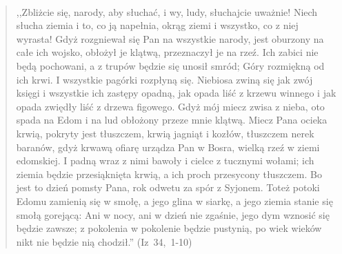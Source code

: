 \documentclass[10pt,a4paper,oneside]{article}
\begin{document}
\paragraph{}
\begin{quote}
,,Zbliżcie się, narody, aby słuchać, i wy, ludy, słuchajcie uważnie! Niech słucha ziemia i to, co ją napełnia, okrąg ziemi i wszystko, co z niej wyrasta! Gdyż rozgniewał się Pan na wszystkie narody, jest oburzony na całe ich wojsko, obłożył je klątwą, przeznaczył je na rzeź. Ich zabici nie będą pochowani, a z trupów będzie się unosił smród; Góry rozmiękną od ich krwi. I wszystkie pagórki rozpłyną się. Niebiosa zwiną się jak zwój księgi i wszystkie ich zastępy opadną, jak opada liść z krzewu winnego i jak opada zwiędły liść z drzewa figowego. Gdyż mój miecz zwisa z nieba, oto spada na Edom i na lud obłożony przeze mnie klątwą. Miecz Pana ocieka krwią, pokryty jest tłuszczem, krwią jagniąt i kozłów, tłuszczem nerek baranów, gdyż krwawą ofiarę urządza Pan w Bosra, wielką rzeź w ziemi edomskiej. I padną wraz z nimi bawoły i cielce z tucznymi wołami; ich ziemia będzie przesiąknięta krwią, a ich proch przesycony tłuszczem. Bo jest to dzień pomsty Pana, rok odwetu za spór z Syjonem. Toteż potoki Edomu zamienią się w smołę, a jego glina w siarkę, a jego ziemia stanie się smołą gorejącą: Ani w nocy, ani w dzień nie zgaśnie, jego dym wznosić się będzie zawsze; z pokolenia w pokolenie będzie pustynią, po wiek wieków nikt nie będzie nią chodził.'' \mbox{(Iz 34, 1-10)}
\end{quote}
\end{document}
